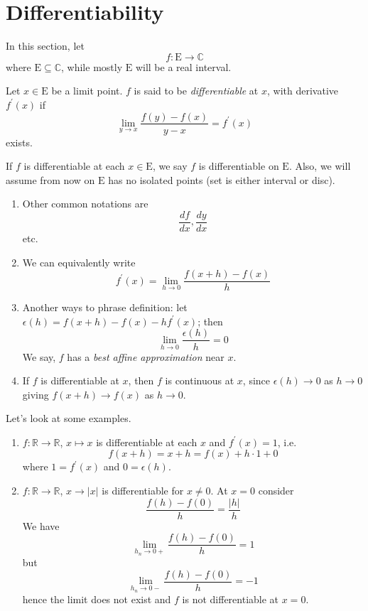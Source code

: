 \documentclass[10pt, a4paper, twoside]{report}
\begin{document}
\section{Differentiability}
In this section, let
\[f:\mathrm{E}\to\mathbb{C}\]
where \(\mathrm{E}\subseteq\mathbb{C}\), while mostly \(\mathrm{E}\) will be a real interval.
\begin{definition}
    Let \(x\in\mathrm{E}\) be a limit point. \(f\) is said to be \emph{differentiable} at \(x\), with derivative \(f^\prime(x)\) if
    \[\lim_{y\to x}\frac{f(y)-f(x)}{y-x}=f^\prime(x)\]
    exists.
\end{definition}
If \(f\) is differentiable at each \(x\in\mathrm{E}\), we say \(f\) is differentiable on \(\mathrm{E}\). Also, we will assume from now on \(\mathrm{E}\) has no isolated points (set is either interval or disc).
\begin{remark} \item[]
    \begin{enumerate}
        \item Other common notations are 
        \[\frac{df}{dx},\frac{dy}{dx}\]
        etc.
        \item We can equivalently write \[f^\prime(x)=\lim_{h\to 0}\frac{f(x+h)-f(x)}{h}\]
        \item Another ways to phrase definition: 
        let \(\epsilon(h)=f(x+h)-f(x)-hf^\prime(x)\); then 
        \[\lim_{h\to 0}\frac{\epsilon(h)}{h}=0\]
        We say, \(f\) has a \emph{best affine approximation} near \(x\).
        \item If \(f\) is differentiable at \(x\), then \(f\) is continuous at \(x\), since \(\epsilon(h)\to 0\) as \(h\to 0\) giving \(f(x+h)\to f(x)\) as \(h\to 0\).
    \end{enumerate}
\end{remark}
Let's look at some examples.
\begin{enumerate}
    \item \(f:\mathbb{R}\to\mathbb{R}\), \(x\mapsto x\) is differentiable at each \(x\) and \(f^\prime(x)=1\), i.e.
    \[f(x+h)=x+h=f(x)+h\cdot 1+0\]
    where \(1=f^\prime(x)\) and \(0=\epsilon(h)\).
    \item \(f:\mathbb{R}\to\mathbb{R}\), \(x\to|x|\) is differentiable for \(x\neq 0\). At \(x=0\) consider
    \[\frac{f(h)-f(0)}{h}=\frac{|h|}{h}\]
    We have
    \[\lim_{h_n\to 0+}\frac{f(h)-f(0)}{h}=1\]
    but
    \[\lim_{h_n\to 0-}\frac{f(h)-f(0)}{h}=-1\]
    hence the limit does not exist and \(f\) is not differentiable at \(x=0\).
\end{enumerate}
\end{document}
